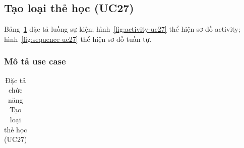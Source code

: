 \subsection{Tạo loại thẻ học (UC27)}
Bảng~\ref{tab:uc27_spec} đặc tả luồng sự kiện; hình~\ref{fig:activity-uc27} thể hiện sơ đồ activity; hình~\ref{fig:sequence-uc27} thể hiện sơ đồ tuần tự.
\subsubsection{Mô tả use case}
\renewcommand{\arraystretch}{1.3}
\setlength{\tbu}{\dimexpr(\linewidth - 4\tabcolsep - 3\arrayrulewidth)/2\relax}
\begin{longtable}{|p{\tbu}|p{\tbu}|}
    \caption{Đặc tả chức năng Tạo loại thẻ học (UC27)} \label{tab:uc27_spec} \\
    

\end{longtable}
